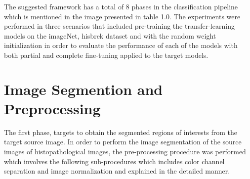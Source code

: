 The suggested framework has a total of 8 phases in the classification pipeline which is mentioned in the image presented in table 1.0. The experiments were performed in three scenarios that included pre-training the transfer-learning models on the imageNet, hisbrek dataset and with the random weight initialization in order to evaluate the performance
of each of the models with both partial and complete fine-tuning applied to the target models.

\section{Image Segmention and Preprocessing}
The first phase, targets to obtain the segmented regions of interests from the target source image. 
In order to perform the image segmentation of the source images of 
histopathological images, the pre-processing procedure was performed which involves 
the following sub-procedures which includes color channel separation and 
image normalization and explained in the detailed manner.
\pagebreak
